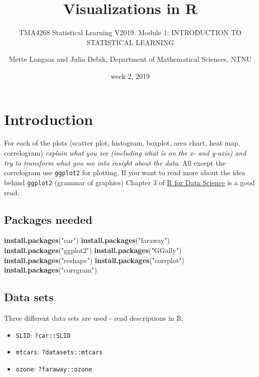 \documentclass[]{article}
\title{Visualizations in R}
\subtitle{TMA4268 Statistical Learning V2019. Module 1: INTRODUCTION TO
STATISTICAL LEARNING}
\author{Mette Langaas and Julia Debik, Department of Mathematical Sciences, NTNU}
\date{week 2, 2019}
\newenvironment{Shaded}{\begin{snugshade}}{\end{snugshade}}
\newcommand{\KeywordTok}[1]{\textcolor[rgb]{0.13,0.29,0.53}{\textbf{#1}}}
\newcommand{\StringTok}[1]{\textcolor[rgb]{0.31,0.60,0.02}{#1}}
\newcommand{\NormalTok}[1]{#1}
\providecommand{\tightlist}{%
  \setlength{\itemsep}{0pt}\setlength{\parskip}{0pt}}
\begin{document}
\maketitle

{
\setcounter{tocdepth}{2}
\tableofcontents
}
\section{Introduction}\label{introduction}

For each of the plots (scatter plot, histogram, boxplot, area chart,
heat map, correlogram) \emph{explain what you see (including what is on
the x- and y-axis) and try to transform what you see into insight about
the data}. All except the correlogram use \texttt{ggplot2} for plotting.
If you want to read more about the idea behind \texttt{ggplot2} (grammar
of graphics) Chapter 3 of \href{}{R for Data Science} is a good read.

\subsection{Packages needed}\label{packages-needed}

\begin{Shaded}
\begin{Highlighting}[]
\KeywordTok{install.packages}\NormalTok{(}\StringTok{"car"}\NormalTok{)}
\KeywordTok{install.packages}\NormalTok{(}\StringTok{"faraway"}\NormalTok{)}
\KeywordTok{install.packages}\NormalTok{(}\StringTok{"ggplot2"}\NormalTok{)}
\KeywordTok{install.packages}\NormalTok{(}\StringTok{"GGally"}\NormalTok{)}
\KeywordTok{install.packages}\NormalTok{(}\StringTok{"reshape"}\NormalTok{)}
\KeywordTok{install.packages}\NormalTok{(}\StringTok{"corrplot"}\NormalTok{)}
\KeywordTok{install.packages}\NormalTok{(}\StringTok{"corrgram"}\NormalTok{)}
\end{Highlighting}
\end{Shaded}

\subsection{Data sets}\label{data-sets}

Three different data sets are used - read descriptions in R:

\begin{itemize}
\tightlist
\item
  \texttt{SLID}: \texttt{?car::SLID}
\item
  \texttt{mtcars}: \texttt{?datasets::mtcars}
\item
  \texttt{ozone}: \texttt{?faraway::ozone}
\end{itemize}
\end{document}
